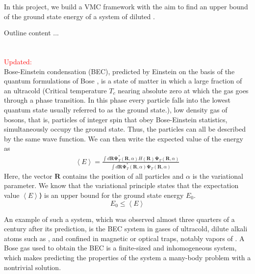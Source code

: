 In this project, we build a VMC framework with the aim to find an upper bound of the ground state energy of a system of diluted \rb. 

Outline content ...
\\\\\\
\textcolor{red}{Updated:}\\
Bose-Einstein condensation (BEC), predicted by Einstein \citeyearpar{BEC1924, BEC1925} on the basis of the quantum formulations of Bose \citeyearpar{Bose1924}, is a state of matter in which a large fraction of an ultracold (Critical temperature $T_c$ nearing absolute zero at which the gas goes through a phase transition. In this phase every particle falls into the lowest quantum state usually referred to as the ground state.),  low density gas of bosons, that is, particles of integer spin that obey Bose-Einstein statistics, simultaneously occupy the ground state. 
Thus, the particles can all be described by the same wave function. We can then write the expected value of the energy as
\begin{align}
    \left\langle E \right\rangle = \frac{\int d\mathbf{R} \mathbf{\Psi}_T^*(\mathbf{R},\alpha) H(\mathbf{R}) \mathbf{\Psi}_T(\mathbf{R},\alpha)}{\int d\mathbf{R} \mathbf{\Psi}_T^*(\mathbf{R},\alpha)\mathbf{\Psi}_T(\mathbf{R},\alpha)}
    \label{eq:eev}
\end{align}
Here, the vector $\mathbf{R}$ contains the position of all particles and $\alpha$ is the variational parameter. 
We know that the variational principle states that the expectation value $\left\langle E \right\rangle$⟩ is an upper bound for the ground state energy $E_0$.
\begin{equation}
E_0 \leq \left\langle E \right\rangle
\label{vp}
\end{equation}

An example of such a system, which was observed almost three quarters of a century after its prediction, is the BEC system in gases of ultracold, dilute alkali atoms such as ,  and  confined in magnetic or optical traps, notably vapors of \citeyearpar{BEC1995}. A Bose gas used to obtain the BEC is a finite-sized and inhomogeneous system, which makes predicting the properties of the system a many-body problem with a nontrivial solution. 


